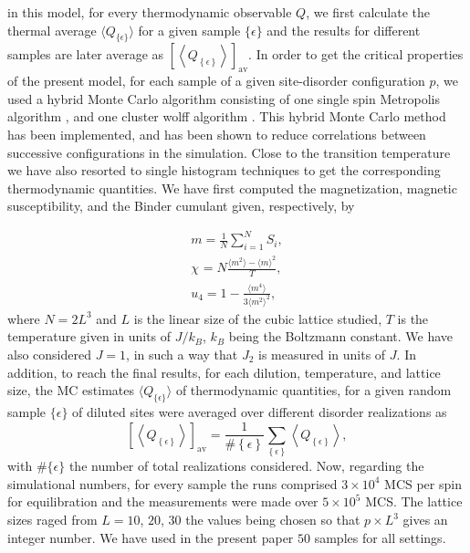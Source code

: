 \documentclass[twocolumn,5p,12pt]{elsarticle}
\begin{document}
in this model, for every thermodynamic observable $Q$, we first calculate the thermal average $\langle Q_{\{\epsilon\}} \rangle$ for a given sample $\{\epsilon \}$ and the results for different samples are later average as $\left[ {\left\langle {Q_{\left\{ \epsilon \right\}} } \right\rangle }\right]_{{\text{av}}}$. In order to get the critical properties of the present model, for each sample of a given site-disorder configuration $p$, we used a hybrid Monte Carlo algorithm consisting of one single spin Metropolis algorithm \cite{newman1999monte}, and one cluster wolff algorithm \cite{wolff1989collective} . This hybrid Monte Carlo method~\cite{creutz, pawig} has been implemented, and has been shown to reduce correlations between successive configurations in the simulation. Close to the transition temperature we have also resorted to single histogram techniques to get the corresponding thermodynamic quantities. We have first computed the magnetization, magnetic susceptibility, and the Binder cumulant given, respectively, by
%

\begin{eqnarray}
m=\frac{1}{N}\sum_{i=1}^{N}S_{i},\\
\label{mag}
\chi_{} = N \frac{\langle m^{2}\rangle -\langle m \rangle
^{2}}{T},\\
u_{4}=1-\frac{\langle m^{4}\rangle}{3\langle m^{2}\rangle^2},
\label{U1}
\end{eqnarray}
%
where $N=2L^3$ and $L$ is the linear size of the cubic lattice studied, $T$ is the temperature given in units of $J/k_B$, $k_B$ being the Boltzmann constant. We have also considered $J=1$, in such a way that $J_2$ is measured in units of $J$.
In addition, to reach the final results, for each dilution, temperature, and lattice size, the MC estimates $\langle Q_{\{\epsilon\}} \rangle$ of thermodynamic quantities, for a given random sample  $\{\epsilon\}$ of diluted sites were averaged over different disorder realizations as
%
\begin{equation}
\left[ {\left\langle {Q_{\left\{ \epsilon  \right\}} } \right\rangle } \right]_{{\text{av}}}  = \frac{1}
{{\# \left\{ \epsilon  \right\}}}\sum\limits_{\left\{ \epsilon  \right\}} {\left\langle {Q_{\left\{ \epsilon
\right\}} } \right\rangle } ,
\label{av}
\end{equation}
%
with $\#\{\epsilon\}$ the number of total realizations considered.
Now, regarding the simulational numbers, for every sample the runs comprised $ 3 \times 10^4$ MCS per spin for equilibration and  the measurements were made over $5 \times 10^5$ MCS. The lattice sizes raged from $L=10$, $20$, $30$ the values being chosen so that $p \times L^3$ gives an integer number. We have used in the present paper $50$ samples for all settings.
\end{document}
